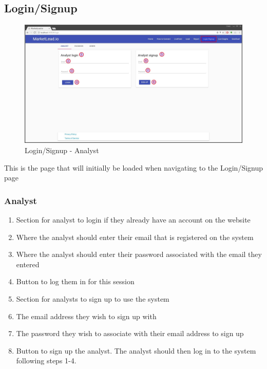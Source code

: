 \documentclass{article}
\begin{document}
		\subsection{Login/Signup}
			\begin{figure}[H]
				\includegraphics[width=\textwidth]{images/login_signup.jpg}
				\caption{Login/Signup - Analyst}
			\end{figure}
			This is the page that will initially be loaded when navigating to the Login/Signup page
			
			\subsubsection{Analyst}
				\begin{enumerate}
					\item Section for analyst to login if they already have an account on the website
					\item Where the analyst should enter their email that is registered on the system
					\item Where the analyst should enter their password associated with the email they entered
					\item Button to log them in for this session
					\item Section for analysts to sign up to use the system
					\item The email address they wish to sign up with
					\item The password they wish to associate with their email address to sign up
					\item Button to sign up the analyst. The analyst should then log in to the system following steps 1-4.
				\end{enumerate}
\end{document}
